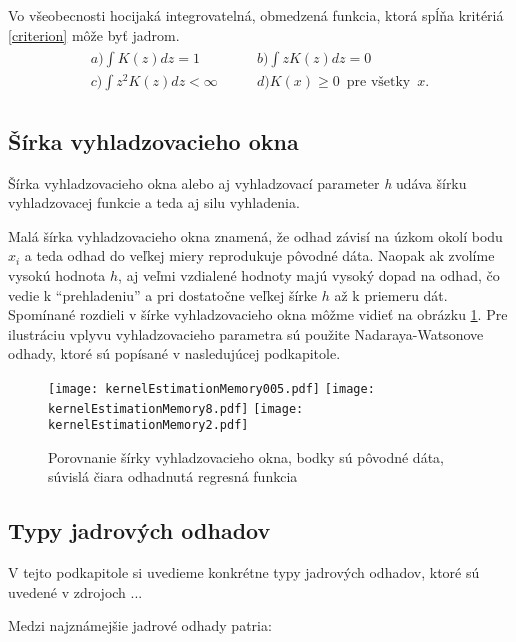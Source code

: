 Vo všeobecnosti hocijaká integrovatelná, obmedzená funkcia, ktorá spĺňa kritériá \ref{criterion} môže byť jadrom.
\begin{align}\label{criterion}
\begin{split}
a) \int K(z)dz = 1 \qquad & b) \int zK(z)dz = 0 \\ 
c) \int z^2K(z)dz < \infty \qquad & d) K(x) \geq 0 \enspace \textrm{pre všetky} \enspace x.
\end{split}
\end{align} 

\subsection{Šírka vyhladzovacieho okna}

Šírka vyhladzovacieho okna alebo aj vyhladzovací parameter \textit{h} udáva šírku vyhladzovacej funkcie a teda aj silu vyhladenia. 

Malá šírka vyhladzovacieho okna znamená, že odhad závisí na úzkom okolí bodu $x_i$ a teda odhad do veľkej miery reprodukuje pôvodné dáta. Naopak ak zvolíme vysokú hodnota $h$, aj veľmi vzdialené hodnoty majú vysoký dopad na odhad, čo vedie k ``prehladeniu'' a pri dostatočne veľkej šírke $h$ až k priemeru dát. Spomínané rozdieli v šírke vyhladzovacieho okna môžme vidieť na obrázku \ref{porovnanieSirky}. Pre ilustráciu vplyvu vyhladzovacieho parametra sú použite Nadaraya-Watsonove odhady, ktoré sú popísané v nasledujúcej podkapitole. 
 
 \begin{figure}[!ht]
  \texttt{[image: kernelEstimationMemory005.pdf]}
  \texttt{[image: kernelEstimationMemory8.pdf]}
  \centering
  \texttt{[image: kernelEstimationMemory2.pdf]}
  \caption{Porovnanie šírky vyhladzovacieho okna, bodky sú pôvodné dáta, súvislá čiara odhadnutá regresná funkcia}\label{porovnanieSirky}
\end{figure}
 
\subsection{Typy jadrových odhadov}
V tejto podkapitole si uvedieme konkrétne typy jadrových odhadov, ktoré sú uvedené v zdrojoch ...

Medzi najznámejšie jadrové odhady patria:

